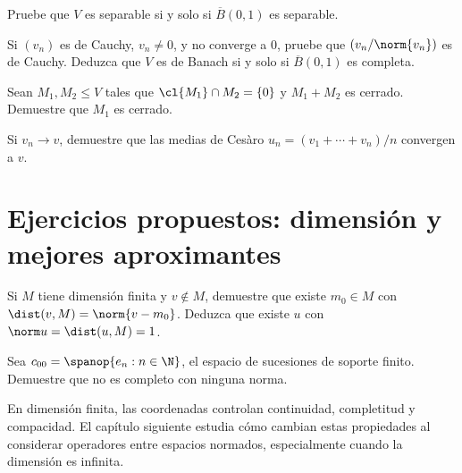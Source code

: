 \begin{ejercicio}\label{ej:lectura-19-4}
Pruebe que $V$ es separable si y solo si $\overline B(0,1)$ es separable.
\end{ejercicio}


\begin{ejercicio}\label{ej:lectura-19-5}
Si $(v_n)$ es de Cauchy, $v_n\ne0$, y no converge a $0$, pruebe que $(v_n/\norm{v_n})$ es de Cauchy. Deduzca que $V$ es de Banach si y solo si $\overline B(0,1)$ es completa.
\end{ejercicio}


\begin{ejercicio}\label{ej:lectura-19-6}
Sean $M_1,M_2\leq V$ tales que $\cl{M_1}\cap M_2=\{0\}$ y $M_1+M_2$ es cerrado. Demuestre que $M_1$ es cerrado.
\end{ejercicio}


\begin{ejercicio}\label{ej:lectura-19-7}
Si $v_n\to v$, demuestre que las medias de Cesàro $u_n=(v_1+\cdots+v_n)/n$ convergen a $v$.
\end{ejercicio}


\section{Ejercicios propuestos: dimensión y mejores aproximantes}

\begin{ejercicio}\label{ej:lectura-22-4}
Si $M$ tiene dimensión finita y $v\notin M$, demuestre que existe $m_0\in M$ con $\dist(v,M)=\norm{v-m_0}$. Deduzca que existe $u$ con $\norm u=\dist(u,M)=1$.
\end{ejercicio}


\begin{ejercicio}\label{ej:lectura-22-5}
Sea $c_{00}=\spanop\{e_n:n\in\N\}$, el espacio de sucesiones de soporte finito. Demuestre que no es completo con ninguna norma.
\end{ejercicio}


En dimensión finita, las coordenadas controlan continuidad, completitud y compacidad. El capítulo siguiente estudia cómo cambian estas propiedades al considerar operadores entre espacios normados, especialmente cuando la dimensión es infinita.

